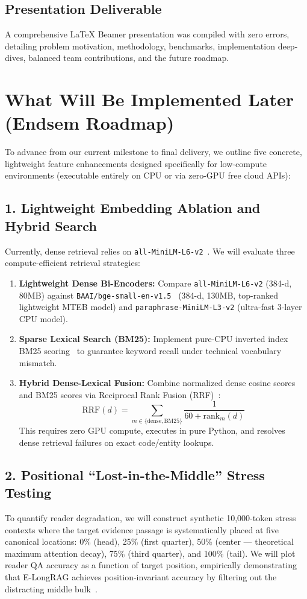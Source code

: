 \documentclass[10pt,journal,compsoc]{IEEEtran}
\begin{document}
\subsection{Presentation Deliverable}
A comprehensive LaTeX Beamer presentation was compiled with zero errors, detailing problem motivation, methodology, benchmarks, implementation deep-dives, balanced team contributions, and the future roadmap.

\section{What Will Be Implemented Later (Endsem Roadmap)}
To advance from our current milestone to final delivery, we outline five concrete, lightweight feature enhancements designed specifically for low-compute environments (executable entirely on CPU or via zero-GPU free cloud APIs):

\subsection{1. Lightweight Embedding Ablation and Hybrid Search}
Currently, dense retrieval relies on \texttt{all-MiniLM-L6-v2}~\cite{sbert}. We will evaluate three compute-efficient retrieval strategies:
\begin{enumerate}
    \item \textbf{Lightweight Dense Bi-Encoders:} Compare \texttt{all-MiniLM-L6-v2} (384-d, 80MB) against \texttt{BAAI/bge-small-en-v1.5}~\cite{bge} (384-d, 130MB, top-ranked lightweight MTEB model) and \texttt{paraphrase-MiniLM-L3-v2} (ultra-fast 3-layer CPU model).
    \item \textbf{Sparse Lexical Search (BM25):} Implement pure-CPU inverted index BM25 scoring~\cite{bm25} to guarantee keyword recall under technical vocabulary mismatch.
    \item \textbf{Hybrid Dense-Lexical Fusion:} Combine normalized dense cosine scores and BM25 scores via Reciprocal Rank Fusion (RRF)~\cite{rrf}:
    \begin{equation}
    \text{RRF}(d) = \sum_{m \in \{\text{dense}, \text{BM25}\}} \frac{1}{60 + \text{rank}_m(d)}
    \end{equation}
    This requires zero GPU compute, executes in pure Python, and resolves dense retrieval failures on exact code/entity lookups.
\end{enumerate}

\subsection{2. Positional ``Lost-in-the-Middle'' Stress Testing}
To quantify reader degradation, we will construct synthetic 10,000-token stress contexts where the target evidence passage is systematically placed at five canonical locations: 0\% (head), 25\% (first quarter), 50\% (center --- theoretical maximum attention decay), 75\% (third quarter), and 100\% (tail). We will plot reader QA accuracy as a function of target position, empirically demonstrating that E-LongRAG achieves position-invariant accuracy by filtering out the distracting middle bulk~\cite{lostinmiddle}.
\end{document}
